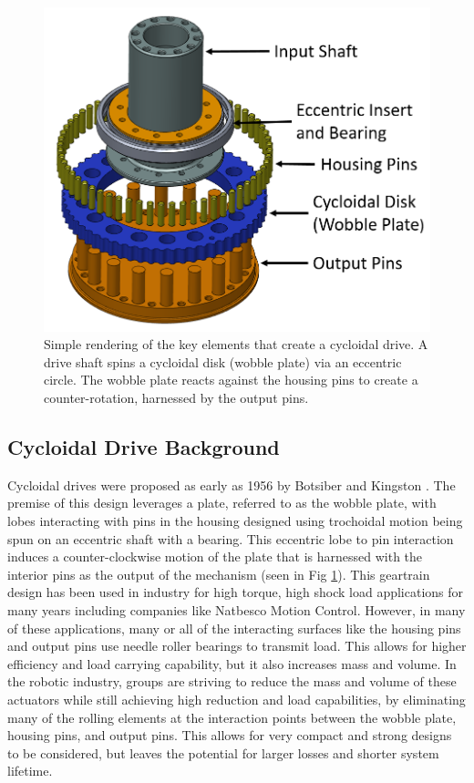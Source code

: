 \begin{figure}[!b]
   \centering
   \includegraphics[width=0.60\linewidth]{images/cycloid_cartoon_v2}
   \caption{Simple rendering of the key elements that create a cycloidal drive.
   A drive shaft spins a cycloidal disk (wobble plate) via an eccentric circle.
   The wobble plate reacts against the housing pins to create a counter-rotation, harnessed by the output pins.}
   \label{cycloid_cartoon}
\end{figure}

\subsection{Cycloidal Drive Background}
Cycloidal drives were proposed as early as 1956 by Botsiber and Kingston \cite{1956}.
The premise of this design leverages a plate, referred to as the wobble plate, with lobes interacting with pins in the housing designed using trochoidal motion being spun on an eccentric shaft with a bearing.
This eccentric lobe to pin interaction induces a counter-clockwise motion of the plate that is harnessed with the interior pins as the output of the mechanism (seen in Fig \ref{cycloid_cartoon}).
This geartrain design has been used in industry for high torque, high shock load applications for many years including companies like Natbesco Motion Control.
However, in many of these applications, many or all of the interacting surfaces like the housing pins and output pins use needle roller bearings to transmit load.
This allows for higher efficiency and load carrying capability, but it also increases mass and volume.
In the robotic industry, groups are striving to reduce the mass and volume of these actuators while still achieving  high reduction and load capabilities, by eliminating many of the rolling elements at the interaction points between the wobble plate, housing pins, and output pins.
This allows for very compact and strong designs to be considered, but leaves the potential for larger losses and shorter system lifetime.


